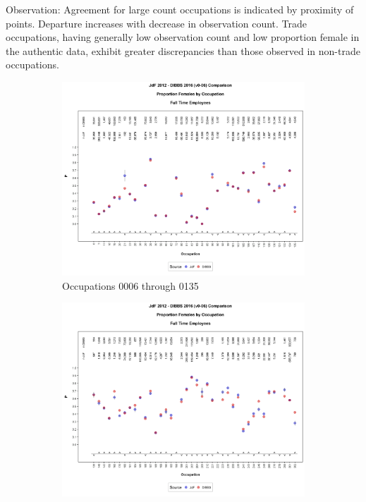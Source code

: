 \documentclass[10pt, letterpaper]{article}
\begin{document}
\begin{spacing}{1.0}
Observation:  Agreement for large count occupations is indicated by proximity of points.  Departure increases with decrease in observation count.  Trade occupations, having generally low observation count and low proportion female in the authentic data, exhibit greater discrepancies than those observed in non-trade occupations.\\

\begin{figure}[h]
    \centering
    \begin{subfigure}{1\textwidth}
        \centering
        \includegraphics[width=6in, trim={0 1in 0 1in}, clip]{JdFDIBBSOccupationProportionBar1.png}
        \caption{Occupations 0006 through 0135}
        \vspace{10pt}
    \end{subfigure}
    \begin{subfigure}{1\textwidth}
        \centering
        \includegraphics[width=6in, trim={0 1in 0 1in}, clip]{JdFDIBBSOccupationProportionBar41.png}

\end{subfigure}
\end{figure}
\end{spacing}
\end{document}
